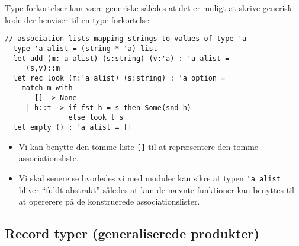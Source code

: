 \documentclass[rgb]{beamer}
\begin{document}
\begin{frame}[fragile]
\begin{footnotesize}

  \vspace{1ex}

  Type-forkortelser kan være generiske således at det er muligt at
  skrive generisk kode der henviser til en type-forkortelse:

  \vspace{1ex}

\begin{lstlisting}[numbers=none,frame=none,mathescape]
  // association lists mapping strings to values of type 'a
  type 'a alist = (string * 'a) list
  let add (m:'a alist) (s:string) (v:'a) : 'a alist =
     (s,v)::m
  let rec look (m:'a alist) (s:string) : 'a option =
    match m with
       [] -> None
     | h::t -> if fst h = s then Some(snd h)
               else look t s
  let empty () : 'a alist = []
\end{lstlisting}

  \begin{itemize}
  \item Vi kan benytte den tomme liste \lstinline{[]} til at repræsentere den tomme associationsliste.
  \item Vi skal senere se hvorledes vi med moduler kan sikre at typen
    \lstinline{'a alist} bliver ``fuldt abstrakt'' således at kun de
    nævnte funktioner kan benyttes til at opererere på de konstruerede
    associationslister.
  \end{itemize}

\end{footnotesize}
\end{frame}

\subsection{Record typer (generaliserede produkter)}
\end{document}
